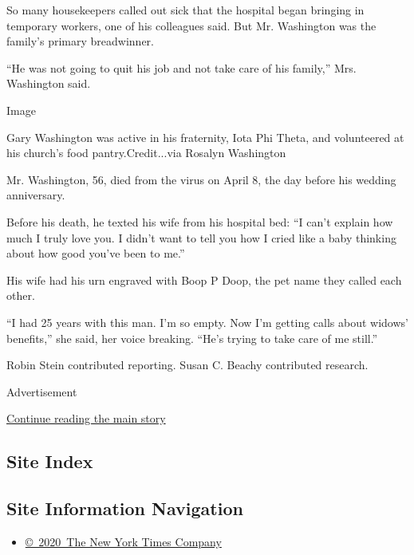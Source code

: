 So many housekeepers called out sick that the hospital began bringing in
temporary workers, one of his colleagues said. But Mr. Washington was
the family's primary breadwinner.

``He was not going to quit his job and not take care of his family,''
Mrs. Washington said.

Image

Gary Washington was active in his fraternity, Iota Phi Theta, and
volunteered at his church's food pantry.Credit...via Rosalyn Washington

Mr. Washington, 56, died from the virus on April 8, the day before his
wedding anniversary.

Before his death, he texted his wife from his hospital bed: ``I can't
explain how much I truly love you. I didn't want to tell you how I cried
like a baby thinking about how good you've been to me.''

His wife had his urn engraved with Boop P Doop, the pet name they called
each other.

``I had 25 years with this man. I'm so empty. Now I'm getting calls
about widows' benefits,'' she said, her voice breaking. ``He's trying to
take care of me still.''

Robin Stein contributed reporting. Susan C. Beachy contributed research.

Advertisement

\protect\hyperlink{after-bottom}{Continue reading the main story}

\hypertarget{site-index}{%
\subsection{Site Index}\label{site-index}}

\hypertarget{site-information-navigation}{%
\subsection{Site Information
Navigation}\label{site-information-navigation}}

\begin{itemize}
\tightlist
\item
  \href{https://help.nytimes.com/hc/en-us/articles/115014792127-Copyright-notice}{©~2020~The
  New York Times Company}
\end{itemize}


